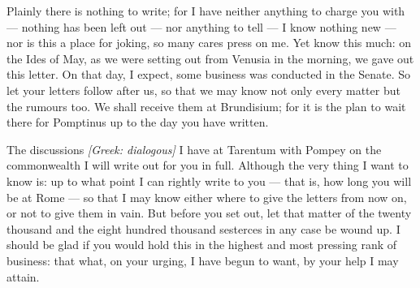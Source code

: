 

 Plainly there is nothing to write; for I have neither anything to charge you with --- nothing has been left out --- nor anything to tell --- I know nothing new --- nor is this a place for joking, so many cares press on me. Yet know this much: on the Ides of May, as we were setting out from Venusia in the morning, we gave out this letter. On that day, I expect, some business was conducted in the Senate. So let your letters follow after us, so that we may know not only every matter but the rumours too. We shall receive them at Brundisium; for it is the plan to wait there for Pomptinus up to the day you have written.

 The discussions \textit{[Greek: dialogous]} I have at Tarentum with Pompey on the commonwealth I will write out for you in full. Although the very thing I want to know is: up to what point I can rightly write to you --- that is, how long you will be at Rome --- so that I may know either where to give the letters from now on, or not to give them in vain. But before you set out, let that matter of the twenty thousand and the eight hundred thousand sesterces in any case be wound up. I should be glad if you would hold this in the highest and most pressing rank of business: that what, on your urging, I have begun to want, by your help I may attain.
